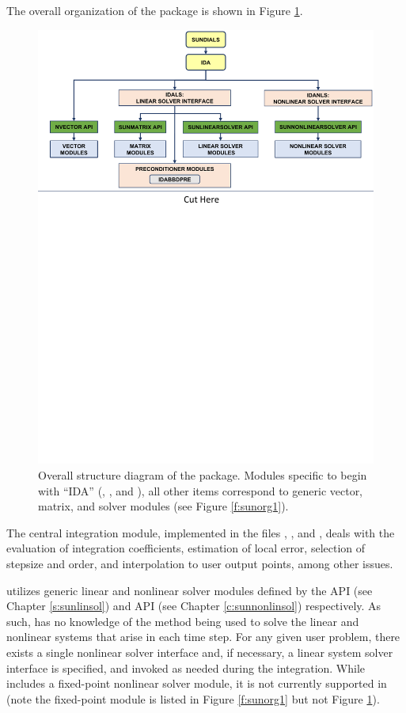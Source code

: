 The overall organization of the {\ida} package is shown in Figure
\ref{f:idaorg}.
\begin{figure}[!htb]
{\centerline{\includegraphics[width=\textwidth]{idaorg}}}
\caption [Overall structure diagram of the {\ida} package]
{Overall structure diagram of the {\ida} package.
  Modules specific to {\ida} begin with ``IDA'' ({\idals}, {\idanls}, and
  {\idabbdpre}), all other items correspond to generic
  {\sundials} vector, matrix, and solver modules (see Figure \ref{f:sunorg1}).}
\label{f:idaorg}
\end{figure}
The central integration module, implemented in the files ,
, and , deals with the evaluation of integration
coefficients, estimation of local error,
selection of stepsize and order, and interpolation to user output
points, among other issues.

{\ida} utilizes generic linear and nonlinear solver modules defined by the
{\sunlinsol} API (see Chapter \ref{s:sunlinsol}) and {\sunnonlinsol} API (see
Chapter \ref{c:sunnonlinsol}) respectively. As such, {\ida} has no knowledge
of the method being used to solve the linear and nonlinear systems that
arise in each time step. For any given user problem, there exists a single
nonlinear solver interface and, if necessary, a linear system solver
interface is specified, and invoked as needed during the integration. While
{\sundials} includes a fixed-point nonlinear solver module, it is not currently
supported in {\ida} (note the fixed-point module is listed in Figure
\ref{f:sunorg1} but not Figure \ref{f:idaorg}).

